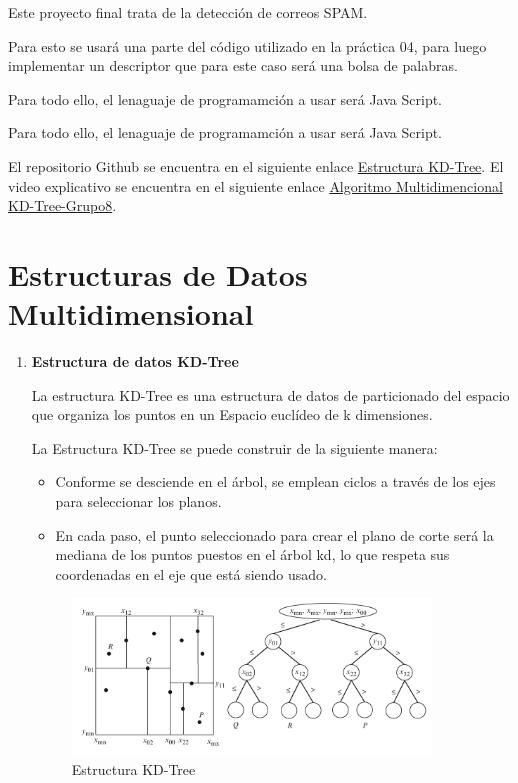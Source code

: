 \documentclass{article}
\begin{document}
	Este proyecto final trata de la detección de correos SPAM.

    Para esto se usará una parte del código utilizado en la práctica 04, para luego implementar un descriptor que para este caso será una bolsa de palabras.

    Para todo ello, el lenaguaje de programamción a usar será Java Script.

    Para todo ello, el lenaguaje de programamción a usar será Java Script.
	
El repositorio Github se encuentra en el siguiente enlace \href{https://github.com/nestorcal/kdtree}{Estructura KD-Tree}.
El video explicativo se encuentra en el siguiente enlace \href{https://drive.google.com/file/d/1SdcIBezyhSePjlnDmgkuoMWF9ytabTYo/view}{Algoritmo Multidimencional KD-Tree-Grupo8}.
	
	\section{Estructuras de Datos Multidimensional}\label{sec:ejercicios}
	\begin{enumerate}
		\item \textbf{Estructura de datos KD-Tree}
		
			La estructura KD-Tree es una estructura de datos de particionado del espacio que organiza los puntos en un Espacio euclídeo de k dimensiones.

La Estructura KD-Tree se puede construir de la siguiente manera: 

\begin{itemize}
   \item Conforme se desciende en el árbol, se emplean ciclos a través de los ejes para seleccionar los planos.
   \item En cada paso, el punto seleccionado para crear el plano de corte será la mediana de los puntos puestos en el árbol kd, lo que respeta sus coordenadas en el eje que está siendo usado.

\end{itemize}	

\begin{figure}[H]
\centering
\includegraphics[width=0.9\textwidth]{Img/KD-Tree.png}
\caption{Estructura KD-Tree}
\end{figure}

\end{enumerate}
\end{document}
